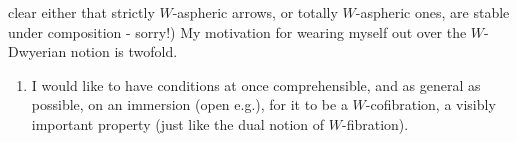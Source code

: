 
clear either that strictly $W$-aspheric arrows, or totally $W$-aspheric ones, are stable under composition - sorry!) My motivation for wearing myself out over the $W$-Dwyerian notion is twofold.

\begin{enumerate}[label=\alph*)]
\item I would like to have conditions at once comprehensible, and as general as possible, on an immersion (open e.g.), for it to be a $W$-cofibration, a visibly important property (just like the dual notion of $W$-fibration). %
\end{enumerate}